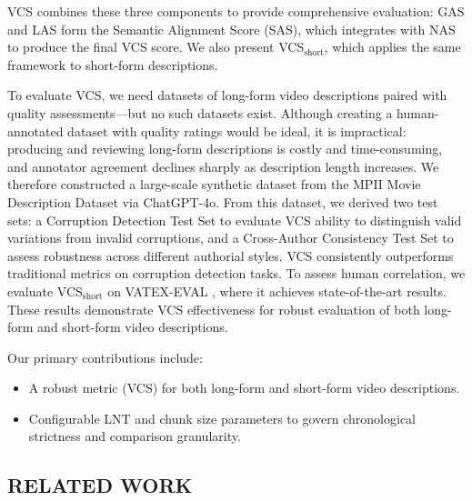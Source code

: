 \documentclass[main.tex]{subfiles}
\begin{document}
VCS combines these three components to provide comprehensive evaluation: GAS and LAS form the Semantic Alignment Score (SAS), which integrates with NAS to produce the final VCS score. We also present VCS$_{\text{short}}$, which applies the same framework to short-form descriptions.

To evaluate VCS, we need datasets of long-form video descriptions paired with quality assessments—but no such datasets exist. Although creating a human-annotated dataset with quality ratings would be ideal, it is impractical: producing and reviewing long-form descriptions is costly and time-consuming, and annotator agreement declines sharply as description length increases. We therefore constructed a large-scale synthetic dataset from the MPII Movie Description Dataset \cite{rohrbach2015dataset} via ChatGPT-4o. From this dataset, we derived two test sets: a Corruption Detection Test Set to evaluate VCS ability to distinguish valid variations from invalid corruptions, and a Cross-Author Consistency Test Set to assess robustness across different authorial styles. VCS consistently outperforms traditional metrics on corruption detection tasks. To assess human correlation, we evaluate VCS$_{\text{short}}$ on VATEX-EVAL \cite{syxl:22}, where it achieves state-of-the-art results. These results demonstrate VCS effectiveness for robust evaluation of both long-form and short-form video descriptions.

Our primary contributions include:
\begin{itemize}
\item A robust metric (VCS) for both long-form and short-form video descriptions.
\item Configurable LNT and chunk size parameters to govern chronological strictness and comparison granularity.
\end{itemize}

\subsection{RELATED WORK}
\end{document}
